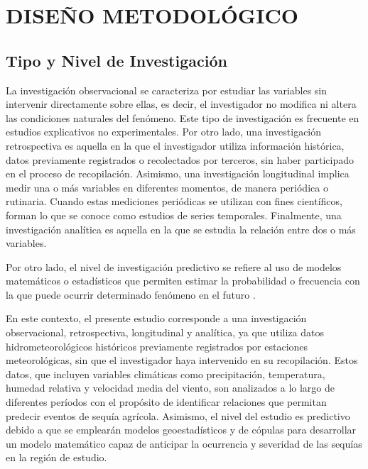 \chapter{DISEÑO METODOLÓGICO}

\section{Tipo y Nivel de Investigación}

La investigación observacional se caracteriza por estudiar las variables sin intervenir directamente sobre ellas, es decir, el investigador no modifica ni altera las condiciones naturales del fenómeno. Este tipo de investigación es frecuente en estudios explicativos no experimentales. Por otro lado, una investigación retrospectiva es aquella en la que el investigador utiliza información histórica, datos previamente registrados o recolectados por terceros, sin haber participado en el proceso de recopilación. Asimismo, una investigación longitudinal implica medir una o más variables en diferentes momentos, de manera periódica o rutinaria. Cuando estas mediciones periódicas se utilizan con fines científicos, forman lo que se conoce como estudios de series temporales. Finalmente, una investigación analítica es aquella en la que se estudia la relación entre dos o más variables.

Por otro lado, el nivel de investigación predictivo se refiere al uso de modelos matemáticos o estadísticos que permiten estimar la probabilidad o frecuencia con la que puede ocurrir determinado fenómeno en el futuro \parencite{supo2024}.

En este contexto, el presente estudio corresponde a una investigación observacional, retrospectiva, longitudinal y analítica, ya que utiliza datos hidrometeorológicos históricos previamente registrados por estaciones meteorológicas, sin que el investigador haya intervenido en su recopilación. Estos datos, que incluyen variables climáticas como precipitación, temperatura, humedad relativa y velocidad media del viento, son analizados a lo largo de diferentes períodos con el propósito de identificar relaciones que permitan predecir eventos de sequía agrícola. Asimismo, el nivel del estudio es predictivo debido a que se emplearán modelos geoestadísticos y de cópulas para desarrollar un modelo matemático capaz de anticipar la ocurrencia y severidad de las sequías en la región de estudio.

